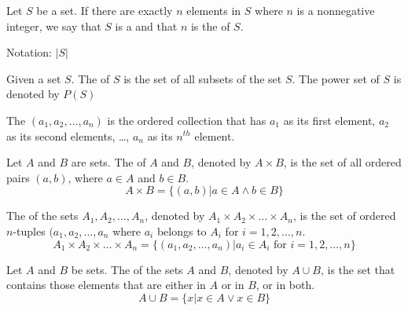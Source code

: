             \par Let $S$ be a set. If there are exactly $n$  elements in $S$ where
            $n$ is a nonnegative integer, we say that $S$ is a  and that $n$ is
            the  of $S$.
            \par Notation: $|S|$

            \par Given a set $S$. The  of $S$ is the set of all subsets of the
            set $S$. The power set of $S$ is denoted by $P(S)$

            \par The  $(a_{1}, a_{2}, \ldots, a_{n})$ is the ordered collection
            that has $a_{1}$ as its first element, $a_{2}$ as its second elements, \ldots, $a_{n}$
            as its $n^{th}$ element.
            \par Let $A$ and $B$ are sets. The  of $A$ and $B$, denoted by
            $A \times B$, is the set of all ordered pairs $(a, b)$, where $a \in A$ and $b \in B$.
            \begin{equation}
                A \times B = \{(a, b) | a \in A \land b \in B\}
            \end{equation}
            \par The  of the sets $A_{1}, A_{2}, \ldots, A_{n}$, denoted by
            $A_{1} \times A_{2} \times \ldots \times A_{n}$, is the set of ordered $n$-tuples
            $(a_{1}, a_{2}, \ldots, a_{n}$ where $a_{i}$ belongs to $A_{i}$ for $i = 1, 2, \ldots, n$.
            \begin{equation}
                A_{1} \times A_{2} \times \ldots \times A_{n}
                = \{(a_{1}, a_{2}, \ldots, a_{n}) | a_{i} \in A_{i} \mbox{ for } i = 1, 2, \ldots, n\}
            \end{equation}

    \hiiEND

            \par Let $A$ and $B$ be sets. The  of the sets $A$ and $B$, denoted by
            $A \cup B$, is the set that contains those elements that are either in $A$ or in $B$,
            or in both.
            \begin{equation}
                A \cup B = \{x | x \in A \lor x \in B\}
            \end{equation}


